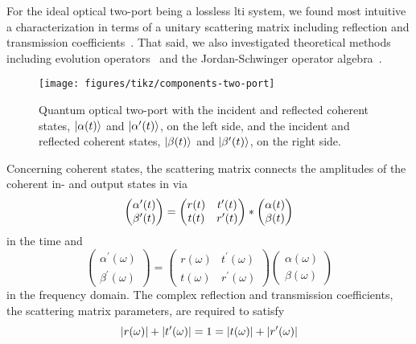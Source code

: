 For the ideal optical two-port being a lossless \gls{lti} system, we found most intuitive a characterization in terms of a unitary scattering matrix including reflection and transmission coefficients~\cite{Vogel2006}.
That said, we also investigated theoretical methods including evolution operators~\cite{Haroche2006} and the Jordan-Schwinger operator algebra~\cite{Leonhardt2003}.
\begin{figure}[htb]
    \centering
    \texttt{[image: figures/tikz/components-two-port]}
    \caption{Quantum optical two-port with the incident and reflected coherent states, $\lvert\alpha(t)\rangle$ and $\lvert\alpha^\prime(t)\rangle$, on the left side, and the incident and reflected coherent states, $\lvert\beta(t)\rangle$ and $\lvert\beta^\prime(t)\rangle$, on the right side.}\label{fig:components_two_port}
\end{figure}
Concerning coherent states, the scattering matrix connects the amplitudes of the coherent in- and output states in  via
\begin{equation}
	\begin{pmatrix}
		\alpha^\prime(t)
		\\
		\beta^\prime(t)
	\end{pmatrix}
	=
	\begin{pmatrix}
		r(t) & t^\prime(t) \\
		t(t) & r^\prime(t)
	\end{pmatrix}
	\ast
	\begin{pmatrix}
		\alpha(t)
		\\
		\beta(t)
	\end{pmatrix}	
\end{equation}
in the time and
\begin{equation}
	\begin{pmatrix}
		\alpha^\prime(\omega)
		\\
		\beta^\prime(\omega)
	\end{pmatrix}
	=
	\begin{pmatrix}
		r(\omega) & t^\prime(\omega) \\
		t(\omega) & r^\prime(\omega)
	\end{pmatrix}
	\begin{pmatrix}
		\alpha(\omega)
		\\
		\beta(\omega)
	\end{pmatrix}	
\end{equation}
in the frequency domain.
The complex reflection and transmission coefficients, the scattering matrix parameters, are required to satisfy
\begin{equation}
	\lvert r(\omega)\rvert
	+
	\lvert t^\prime(\omega)\rvert
	=
	1
	=
	\lvert t(\omega)\rvert
	+
	\lvert r^\prime(\omega)\rvert
\end{equation}
